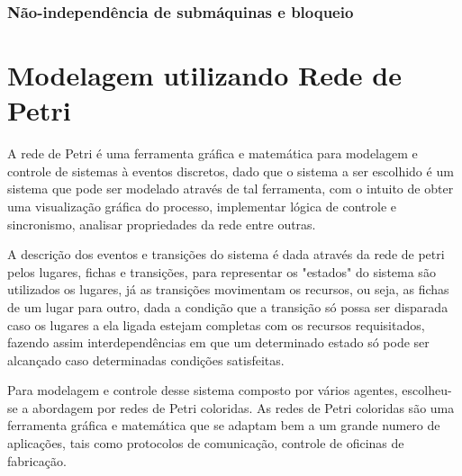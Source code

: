 \subsubsection{Não-independência de submáquinas e bloqueio}


\section{Modelagem utilizando Rede de Petri}

A rede de Petri é uma ferramenta gráfica e matemática para modelagem e controle de sistemas à eventos discretos, dado que o sistema a ser escolhido é um sistema que pode ser modelado através de tal ferramenta, com o intuito de obter uma visualização gráfica do processo, implementar lógica de controle e sincronismo, analisar propriedades da rede entre outras.

A descrição dos eventos e transições do sistema é dada através da rede de petri pelos lugares, fichas e transições, para representar os "estados" do sistema são utilizados os lugares, já as transições movimentam os recursos, ou seja, as fichas de um lugar para outro, dada a condição que a transição só possa ser disparada caso os lugares a ela ligada estejam completas com os recursos requisitados, fazendo assim interdependências em que um determinado estado só pode ser alcançado caso determinadas condições satisfeitas.

Para modelagem e controle desse sistema composto por vários agentes, escolheu-se a abordagem por redes de Petri coloridas. As redes de Petri  coloridas são uma ferramenta gráfica e matemática que se adaptam bem a um grande numero de aplicações, tais como protocolos de comunicação, controle de oficinas de fabricação. 
